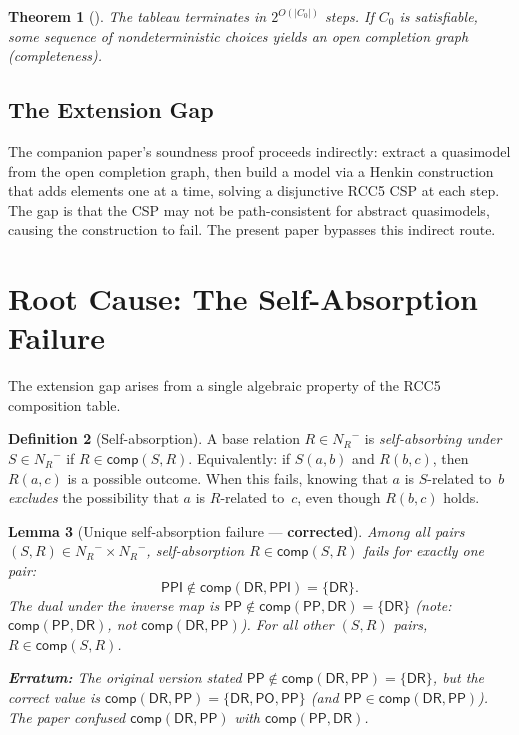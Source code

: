 \documentclass[a4paper,11pt]{article}
\newtheorem{theorem}{Theorem}[section]
\newtheorem{lemma}[theorem]{Lemma}
\theoremstyle{definition}
\newtheorem{definition}[theorem]{Definition}
\newcommand{\NR}{\ensuremath{N_R}}
\newcommand{\DR}{\ensuremath{\mathsf{DR}}}
\newcommand{\PO}{\ensuremath{\mathsf{PO}}}
\newcommand{\PP}{\ensuremath{\mathsf{PP}}}
\newcommand{\PPI}{\ensuremath{\mathsf{PPI}}}
\newcommand{\comp}{\ensuremath{\mathsf{comp}}}
\begin{document}
\begin{theorem}[\cite{CompanionPaper}]
\label{thm:term-complete}
The tableau terminates in $2^{O(|C_0|)}$ steps.  If $C_0$ is
satisfiable, some sequence of nondeterministic choices yields an open
completion graph \textup{(}completeness\textup{)}.
\end{theorem}

\subsection{The Extension Gap}

The companion paper's soundness proof proceeds indirectly: extract
a quasimodel from the open completion graph, then build a model via
a Henkin construction that adds elements one at a time, solving a
disjunctive RCC5 CSP at each step.  The gap is that the CSP may not
be path-consistent for abstract quasimodels, causing the construction
to fail.  The present paper bypasses this indirect route.


\section{Root Cause: The Self-Absorption Failure}
\label{sec:root-cause}

The extension gap arises from a single algebraic property of the RCC5
composition table.

\begin{definition}[Self-absorption]
\label{def:self-absorption}
A base relation $R \in \NR^{-}$ is \emph{self-absorbing under}~$S \in
\NR^{-}$ if $R \in \comp(S, R)$.  Equivalently: if $S(a,b)$ and
$R(b,c)$, then $R(a,c)$ is a possible outcome.  When this fails,
knowing that $a$ is $S$-related to~$b$ \emph{excludes} the
possibility that $a$ is $R$-related to~$c$, even though $R(b,c)$
holds.
\end{definition}

\begin{lemma}[Unique self-absorption failure --- \textbf{corrected}]
\label{lem:unique-failure}
Among all pairs $(S, R) \in \NR^{-} \times \NR^{-}$, self-absorption
$R \in \comp(S, R)$ fails for exactly one pair:
\[
  \PPI \notin \comp(\DR, \PPI) = \{\DR\}.
\]
The dual under the inverse map is $\PP \notin \comp(\PP, \DR) =
\{\DR\}$ (note: $\comp(\PP, \DR)$, not $\comp(\DR, \PP)$).  For all
other $(S, R)$ pairs, $R \in \comp(S,R)$.

\smallskip\noindent
\textbf{Erratum:} The original version stated
$\PP \notin \comp(\DR, \PP) = \{\DR\}$, but the correct value is
$\comp(\DR, \PP) = \{\DR, \PO, \PP\}$ (and $\PP \in \comp(\DR, \PP)$).
The paper confused $\comp(\DR, \PP)$ with $\comp(\PP, \DR)$.
\end{lemma}
\end{document}
